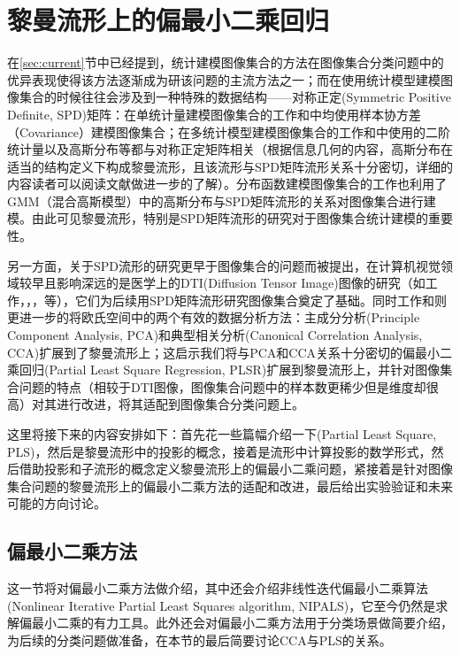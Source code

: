 \chapter{黎曼流形上的偏最小二乘回归}
\label{cha:rpls}
在\ref{sec:current}节中已经提到，统计建模图像集合的方法在图像集合分类问题中的优异表现使得该方法逐渐成为研该问题的主流方法之一；而在使用统计模型建模图像集合的时候往往会涉及到一种特殊的数据结构——对称正定(Symmetric Positive Definite, SPD)矩阵：在单统计量建模图像集合的工作\cite{Statistics_CDL}和\cite{Statistics_SPDML}中均使用样本协方差（Covariance）建模图像集合；在多统计模型建模图像集合的工作\cite{Statistics_LMKML}和\cite{Statistics_HERML}中使用的二阶统计量以及高斯分布等都与对称正定矩阵相关（根据信息几何的内容\cite{Information_geometry}，高斯分布在适当的结构定义下构成黎曼流形，且该流形与SPD矩阵流形关系十分密切，详细的内容读者可以阅读文献\cite{Information_geometry}做进一步的了解）。分布函数建模图像集合的工作\cite{Statistics_DARG}也利用了GMM（混合高斯模型）中的高斯分布与SPD矩阵流形的关系对图像集合进行建模。由此可见黎曼流形，特别是SPD矩阵流形的研究对于图像集合统计建模的重要性。

另一方面，关于SPD流形的研究更早于图像集合的问题而被提出，在计算机视觉领域较早且影响深远的是医学上的DTI(Diffusion Tensor Image)图像的研究（如工作\cite{AIM_metric}，\cite{LEM_metric}，\cite{PGA}，\cite{RCCA}等），它们为后续用SPD矩阵流形研究图像集合奠定了基础。同时工作\cite{PGA}和\cite{RCCA}则更进一步的将欧氏空间中的两个有效的数据分析方法：主成分分析(Principle Component Analysis, PCA)和典型相关分析(Canonical Correlation Analysis, CCA)扩展到了黎曼流形上；这启示我们将与PCA和CCA关系十分密切的偏最小二乘回归(Partial Least Square Regression, PLSR)扩展到黎曼流形上，并针对图像集合问题的特点（相较于DTI图像，图像集合问题中的样本数更稀少但是维度却很高）对其进行改进，将其适配到图像集合分类问题上。

这里将接下来的内容安排如下：首先花一些篇幅介绍一下(Partial Least Square, PLS)，然后是黎曼流形中的投影的概念，接着是流形中计算投影的数学形式，然后借助投影和子流形的概念定义黎曼流形上的偏最小二乘问题，紧接着是针对图像集合问题的黎曼流形上的偏最小二乘方法的适配和改进，最后给出实验验证和未来可能的方向讨论。

\section{偏最小二乘方法}
\label{sec:plsr}
这一节将对偏最小二乘方法做介绍，其中还会介绍非线性迭代偏最小二乘算法(Nonlinear Iterative Partial Least Squares algorithm, NIPALS\cite{pls_NIPALS})，它至今仍然是求解偏最小二乘的有力工具。此外还会对偏最小二乘方法用于分类场景做简要介绍，为后续的分类问题做准备，在本节的最后简要讨论CCA与PLS的关系。


